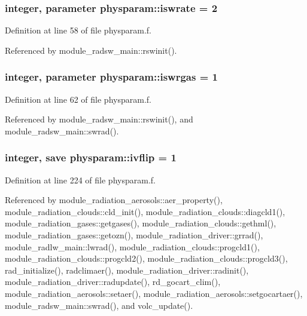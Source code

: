\subsubsection[{\texorpdfstring{iswrate}{iswrate}}]{\setlength{\rightskip}{0pt plus 5cm}integer, parameter physparam\+::iswrate = 2}\hypertarget{namespacephysparam_a20514cb92f09ee6e32f2f1def570ace1}{}\label{namespacephysparam_a20514cb92f09ee6e32f2f1def570ace1}


Definition at line 58 of file physparam.\+f.



Referenced by module\+\_\+radsw\+\_\+main\+::rswinit().

\subsubsection[{\texorpdfstring{iswrgas}{iswrgas}}]{\setlength{\rightskip}{0pt plus 5cm}integer, parameter physparam\+::iswrgas = 1}\hypertarget{namespacephysparam_a8782cc8df3a1d906c2ddb3d900468568}{}\label{namespacephysparam_a8782cc8df3a1d906c2ddb3d900468568}


Definition at line 62 of file physparam.\+f.



Referenced by module\+\_\+radsw\+\_\+main\+::rswinit(), and module\+\_\+radsw\+\_\+main\+::swrad().

\subsubsection[{\texorpdfstring{ivflip}{ivflip}}]{\setlength{\rightskip}{0pt plus 5cm}integer, save physparam\+::ivflip = 1}\hypertarget{namespacephysparam_a7318a941744b1ec62dc9a6ff5bfbb50d}{}\label{namespacephysparam_a7318a941744b1ec62dc9a6ff5bfbb50d}


Definition at line 224 of file physparam.\+f.



Referenced by module\+\_\+radiation\+\_\+aerosols\+::aer\+\_\+property(), module\+\_\+radiation\+\_\+clouds\+::cld\+\_\+init(), module\+\_\+radiation\+\_\+clouds\+::diagcld1(), module\+\_\+radiation\+\_\+gases\+::getgases(), module\+\_\+radiation\+\_\+clouds\+::gethml(), module\+\_\+radiation\+\_\+gases\+::getozn(), module\+\_\+radiation\+\_\+driver\+::grrad(), module\+\_\+radlw\+\_\+main\+::lwrad(), module\+\_\+radiation\+\_\+clouds\+::progcld1(), module\+\_\+radiation\+\_\+clouds\+::progcld2(), module\+\_\+radiation\+\_\+clouds\+::progcld3(), rad\+\_\+initialize(), radclimaer(), module\+\_\+radiation\+\_\+driver\+::radinit(), module\+\_\+radiation\+\_\+driver\+::radupdate(), rd\+\_\+gocart\+\_\+clim(), module\+\_\+radiation\+\_\+aerosols\+::setaer(), module\+\_\+radiation\+\_\+aerosols\+::setgocartaer(), module\+\_\+radsw\+\_\+main\+::swrad(), and volc\+\_\+update().

